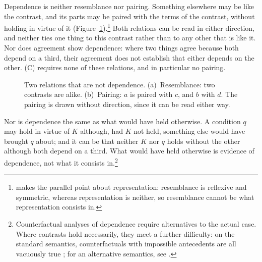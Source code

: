 \documentclass[11pt,a4paper,oneside]{scrartcl}
\begin{document}
Dependence is neither resemblance nor pairing. Something elsewhere may be like the contrast, and its
parts may be paired with the terms of the contrast, without holding in virtue of it
(Figure~\ref{fig:correspondence}).\footnote{\textcite[ch.~1]{goodman1976} makes the parallel point
about representation: resemblance is reflexive and symmetric, whereas representation is neither, so
resemblance cannot be what representation consists in.} Both relations can be read in either
direction, and neither ties one thing to this contrast rather than to any other that is like it.
Nor does agreement show dependence: where two things agree because both depend on a third, their
agreement does not establish that either depends on the other. (C) requires none of these
relations, and in particular no pairing.

\begin{figure}[tp]
  \centering\small
  \caption{Two relations that are not dependence. (a)~Resemblance: two contrasts are alike.
    (b)~Pairing: $a$ is paired with $c$, and $b$ with $d$. The pairing is drawn without direction,
    since it can be read either way.}
  \label{fig:correspondence}
\end{figure}

Nor is dependence the same as what would have held otherwise. A condition $q$ may hold in virtue of
$K$ although, had $K$ not held, something else would have brought $q$ about; and it can be that neither
$K$ nor $q$ holds without the other although both depend on a third. What would have held otherwise
is evidence of dependence, not what it consists in.\footnote{Counterfactual analyses of dependence
require alternatives to the actual case. Where contrasts hold necessarily, they meet a further
difficulty: on the standard semantics, counterfactuals with impossible antecedents are all
vacuously true \autocite{lewis1973}; for an alternative semantics, see \textcite{nolan1997}.}
\end{document}
